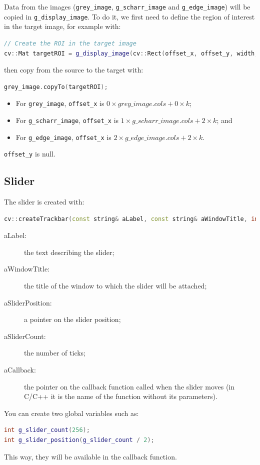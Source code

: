 \documentclass[english,a4paper,12pt,oneside]{article}
\begin{document}
Data from the images (\verb+grey_image+, \verb+g_scharr_image+ and \verb+g_edge_image+) will be copied in \verb+g_display_image+. 
To do it, we first need to define the region of interest in the target image, for example with:
 \begin{lstlisting}[language=c++]
// Create the ROI in the target image
cv::Mat targetROI = g_display_image(cv::Rect(offset_x, offset_y, width, height))
\end{lstlisting}
then copy from the source to the target with:
 \begin{lstlisting}[language=c++]
grey_image.copyTo(targetROI);
\end{lstlisting}
\begin{itemize}
 \item For \verb+grey_image+,     \verb+offset_x+ is $0 \times grey\_image.cols + 0 \times k$;
 \item For \verb+g_scharr_image+, \verb+offset_x+ is $1 \times g\_scharr\_image.cols + 2 \times k$; and
 \item For \verb+g_edge_image+,   \verb+offset_x+ is $2 \times g\_edge\_image.cols + 2 \times k$. 
\end{itemize}
\verb+offset_y+ is null.


\subsection{Slider}

The slider is created with:
 \begin{lstlisting}[language=c++]
        cv::createTrackbar(const string& aLabel, const string& aWindowTitle, int* aSliderPosition, int aSliderCount, void (*aCallback)(int, void*));
\end{lstlisting}
\begin{description}
 \item[aLabel:] the text describing the slider;
 \item[aWindowTitle:] the title of the window to which the slider will be attached;
 \item[aSliderPosition:] a pointer on the slider position;
 \item[aSliderCount:] the number of ticks;
 \item[aCallback:] the pointer on the callback function called when the slider moves (in C/C++ it is the name of the function without its parameters).
\end{description}

You can create two global variables such as:
\begin{lstlisting}[language=c++]
int g_slider_count(256);
int g_slider_position(g_slider_count / 2);
\end{lstlisting}
This way, they will be available in the callback function. 
 
\end{document}
